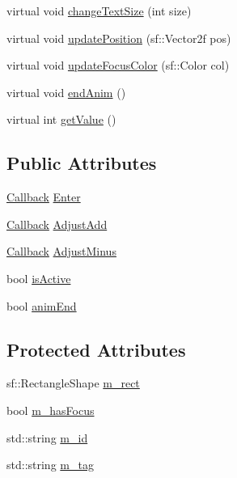 \begin{DoxyCompactItemize}
virtual void \mbox{\hyperlink{class_widget_a958763d528cd422de5f248d83530f68b}{change\+Text\+Size}} (int size)
\item 
virtual void \mbox{\hyperlink{class_widget_a49b72dfbd65f07a616d6e33b04675b9a}{update\+Position}} (sf\+::\+Vector2f pos)
\item 
virtual void \mbox{\hyperlink{class_widget_aef48b79ed822a3ad4e5a2b719e57f350}{update\+Focus\+Color}} (sf\+::\+Color col)
\item 
virtual void \mbox{\hyperlink{class_widget_abbbedd98778706d6a7cfe2ecf27413fb}{end\+Anim}} ()
\item 
virtual int \mbox{\hyperlink{class_widget_a3b53c2690d2b33fceb73e9059458480f}{get\+Value}} ()
\end{DoxyCompactItemize}
\subsection*{Public Attributes}
\begin{DoxyCompactItemize}
\item 
\mbox{\hyperlink{class_widget_af75970041184b1a72bceff618e142a09}{Callback}} \mbox{\hyperlink{class_widget_ac1f5bd0e5692a897ee3b3b5ec2345336}{Enter}}
\item 
\mbox{\hyperlink{class_widget_af75970041184b1a72bceff618e142a09}{Callback}} \mbox{\hyperlink{class_widget_a64087ac2bd8c3c298015688d0b4fc9e1}{Adjust\+Add}}
\item 
\mbox{\hyperlink{class_widget_af75970041184b1a72bceff618e142a09}{Callback}} \mbox{\hyperlink{class_widget_ad542bffdf09356c763dcc0ab8cd7916c}{Adjust\+Minus}}
\item 
bool \mbox{\hyperlink{class_widget_a64b854e95ea9c7483c01b278f3ce417b}{is\+Active}}
\item 
bool \mbox{\hyperlink{class_widget_a7deb9286ee1faafbe8e988877d4d3ab3}{anim\+End}}
\end{DoxyCompactItemize}
\subsection*{Protected Attributes}
\begin{DoxyCompactItemize}
\item 
sf\+::\+Rectangle\+Shape \mbox{\hyperlink{class_widget_af647702f170f76cd1698b749f6ca2faa}{m\+\_\+rect}}
\item 
bool \mbox{\hyperlink{class_widget_a214eddd764f01e626e7098fec1aa0deb}{m\+\_\+has\+Focus}}
\item 
std\+::string \mbox{\hyperlink{class_widget_a1c75da927843305835b9913101c9a701}{m\+\_\+id}}
\item 
std\+::string \mbox{\hyperlink{class_widget_ae0b0fc817eb62bdc9dd3aa5459020887}{m\+\_\+tag}}
\end{DoxyCompactItemize}


